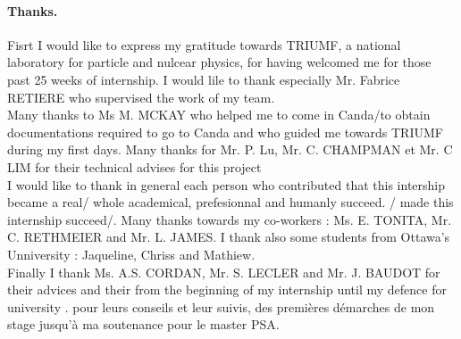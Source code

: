 \documentclass[a4paper, 11pt]{report}%
\begin{document}




\newpage
\thispagestyle{empty}

\vspace{1cm}
\paragraph{Thanks.}\hspace{1cm}
  
  Fisrt I would like to express my gratitude towards TRIUMF, a national laboratory for particle and nulcear physics, for having welcomed 
  me for those past 25 weeks of internship. I would lile to thank especially Mr. Fabrice RETIERE who supervised the work of my team. 
  \\ 
  
  Many thanks to Ms M. MCKAY who helped me to come in Canda/to obtain documentations required to go to Canda and who guided me towards 
  TRIUMF during my first days.
  Many thanks for Mr. P. Lu, Mr. C. CHAMPMAN et Mr. C LIM for their technical advises for this project
  \\
  
  I would like to thank in general each person who contributed that this intership became a real/ whole academical, prefesionnal and 
  humanly succeed. 
  / made this internship succeed/. Many thanks towards my co-workers : Ms. E. TONITA, Mr. C. RETHMEIER and Mr. L. JAMES. I thank also 
  some students from Ottawa's Unniversity : Jaqueline, Chriss and Mathiew.
  \\
  
  Finally I thank Ms. A.S. CORDAN, Mr. S. LECLER and Mr. J. BAUDOT for their advices and their from the beginning of my internship until my 
  defence for university . pour leurs conseils et leur suivis, 
  des premières démarches de mon stage jusqu'à ma soutenance pour le master PSA.
  \\

\end{document}
